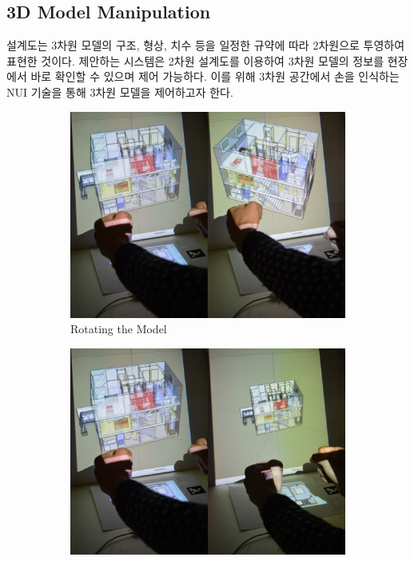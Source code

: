 \subsection{3D Model Manipulation}
설계도는 3차원 모델의 구조, 형상, 치수 등을 일정한 규약에 따라 2차원으로 투영하여 표현한 것이다. 제안하는 시스템은 2차원 설계도를 이용하여 3차원 모델의 정보를 현장에서 바로 확인할 수 있으며 제어 가능하다. 이를 위해 3차원 공간에서 손을 인식하는 NUI 기술을 통해 3차원 모델을 제어하고자 한다.
\begin{figure}[!ht]
	\centering
        \begin{subfigure}[b]{0.32\textwidth}
	        \centering
                \includegraphics[width=\textwidth]{4-Interaction_Design/3d_rotate}
                \caption{Rotating the Model}
                \label{fig:rotate}
        \end{subfigure}%
        \hfill
        \begin{subfigure}[b]{0.32\textwidth}
            \centering
            \includegraphics[width=\textwidth]{4-Interaction_Design/3d_scale_two_hand}

\end{subfigure}
\end{figure}
